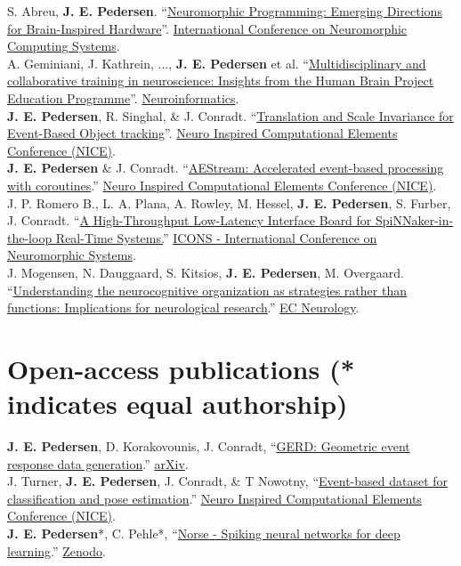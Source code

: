 \documentclass[11pt, a4paper]{article}
\newcommand{\years}[1]{\marginnote{\scriptsize #1}}
\begin{document}
\years{2024} S. Abreu, \textbf{J. E. Pedersen}.
``\href{https://ieeexplore.ieee.org/document/10766507}{Neuromorphic Programming: Emerging Directions for Brain-Inspired Hardware}''.
\href{https://iconsneuromorphic.cc/}{International Conference on Neuromorphic Computing Systems}. \\
\years{2024}A. Geminiani, J. Kathrein, ..., \textbf{J. E. Pedersen} et al. ``\href{https://link.springer.com/article/10.1007/s12021-024-09682-6}{Multidisciplinary and collaborative training in neuroscience: Insights from the Human Brain Project Education Programme}''. \href{https://link.springer.com/journal/12021}{Neuroinformatics}. \\
\years{2023} \textbf{J. E. Pedersen}, R. Singhal, \& J. Conradt.
``\href{https://dl.acm.org/doi/10.1145/3584954.3584996}{Translation and Scale Invariance for Event-Based Object tracking}''.
\href{https://niceworkshop.org/}{Neuro Inspired Computational Elements Conference (NICE)}. \\
\years{2023} \textbf{J. E. Pedersen} \& J. Conradt.
``\href{https://dl.acm.org/doi/fullHtml/10.1145/3584954.3584997}{AEStream: Accelerated event-based processing with coroutines}.''
\href{https://niceworkshop.org/}{Neuro Inspired Computational Elements Conference (NICE)}. \\
\years{2023} J. P. Romero B., L. A. Plana, A. Rowley, M. Hessel, \textbf{J. E. Pedersen}, S. Furber, J. Conradt.
``\href{https://dl.acm.org/doi/pdf/10.1145/3589737.3605969}{A High-Throughput Low-Latency Interface Board for SpiNNaker-in-the-loop Real-Time Systems.}''
\href{https://icons.ornl.gov/}{ICONS - International Conference on Neuromorphic Systems}. \\
\years{2018} J. Mogensen, N. Dauggaard, S. Kitsios, \textbf{J. E. Pedersen}, M. Overgaard.
``\href{https://researchprofiles.ku.dk/en/publications/understanding-the-neurocognitive-organization-as-strategies-rathe}{Understanding the neurocognitive organization as strategies rather than functions: Implications for neurological research}.''
\href{https://ecronicon.net/ec_neurology}{EC Neurology}.

\section*{Open-access publications {\small (* indicates equal authorship)}}
\years{2025} \textbf{J. E. Pedersen}, D. Korakovounis, J. Conradt, ``\href{https://arxiv.org/abs/2412.03259}{GERD: Geometric event response data generation}.'' \href{https://arxiv.org/abs/2412.03259}{arXiv}. \\
\years{2022} J. Turner, \textbf{J. E. Pedersen}, J. Conradt, \& T Nowotny, ``\href{https://dl.acm.org/doi/10.1145/3517343.3517378}{Event-based dataset for classification and pose estimation}.''
\href{https://niceworkshop.org/}{Neuro Inspired Computational Elements Conference (NICE)}. \\
\years{2020} \textbf{J. E. Pedersen}*, C. Pehle*, ``\href{https://zenodo.org/record/4422025}{Norse - Spiking neural networks for deep learning}.''
\href{https://zenodo.org}{Zenodo}.
\end{document}
